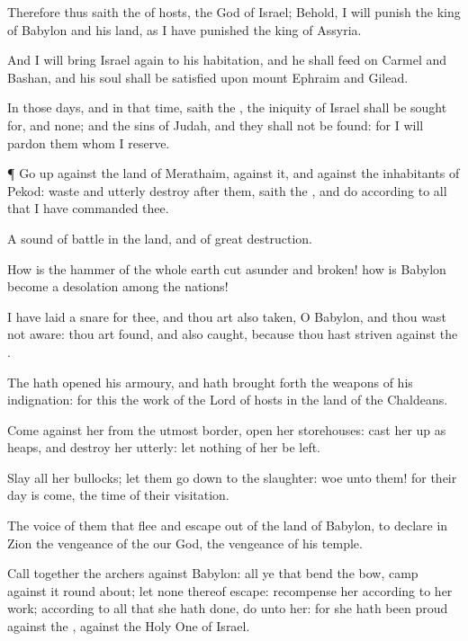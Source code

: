 {Therefore thus
saith the
{} of
hosts, the
God of
Israel; Behold, I will
punish the
king of
Babylon and his
land, as I have
punished the
king of
Assyria.

And I will
bring
Israel
again to his
habitation, and he shall
feed on
Carmel and
Bashan, and his
soul shall be
satisfied upon
mount
Ephraim and
Gilead.

In those
days, and in that
time,
saith the
{}, the
iniquity of
Israel shall be sought
for, and
{} none; and the
sins of
Judah, and they shall not be
found: for I will
pardon them whom I
reserve.


\par }{\PP {}¶ Go
up against the
land of
Merathaim,
{} against it, and against the
inhabitants of
Pekod:
waste and utterly
destroy
after them,
saith the
{}, and
do according to all that I have
commanded thee.

A
sound of
battle
{} in the
land, and of
great
destruction.

How is the
hammer of the whole
earth cut
asunder and
broken! how is
Babylon become a
desolation among the
nations!

I have laid a
snare for thee, and thou art also
taken, O
Babylon, and thou wast not
aware: thou art
found, and also
caught, because thou hast
striven against the
{}.

The
{} hath
opened his
armoury, and hath brought
forth the
weapons of his
indignation: for this
{} the
work of the
Lord
{} of
hosts in the
land of the
Chaldeans.

Come against her from the utmost
border,
open her
storehouses: cast her
up as
heaps, and destroy her
utterly: let nothing of her be
left.

Slay all her
bullocks; let them go
down to the
slaughter:
woe unto them! for their
day is
come, the
time of their
visitation.

The
voice of them that
flee and escape
out of the
land of
Babylon, to
declare in
Zion the
vengeance of the
{} our
God, the
vengeance of his
temple.

Call
together the
archers against
Babylon: all ye that
bend the
bow,
camp against it round
about; let none thereof
escape:
recompense her according to her
work; according to all that she hath
done,
do unto her: for she hath been
proud against the
{}, against the Holy
One of
Israel.

}
